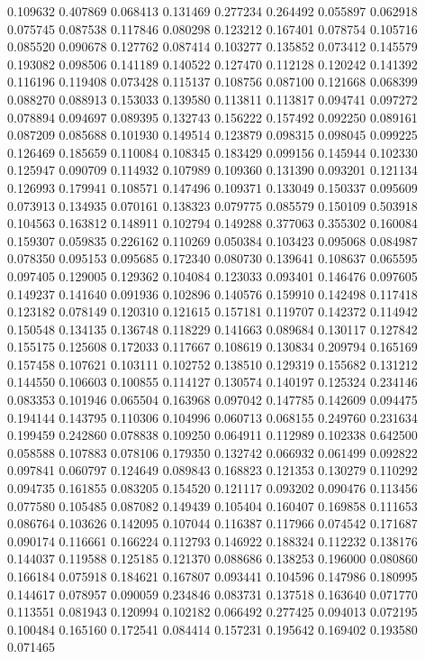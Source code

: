 0.109632
0.407869
0.068413
0.131469
0.277234
0.264492
0.055897
0.062918
0.075745
0.087538
0.117846
0.080298
0.123212
0.167401
0.078754
0.105716
0.085520
0.090678
0.127762
0.087414
0.103277
0.135852
0.073412
0.145579
0.193082
0.098506
0.141189
0.140522
0.127470
0.112128
0.120242
0.141392
0.116196
0.119408
0.073428
0.115137
0.108756
0.087100
0.121668
0.068399
0.088270
0.088913
0.153033
0.139580
0.113811
0.113817
0.094741
0.097272
0.078894
0.094697
0.089395
0.132743
0.156222
0.157492
0.092250
0.089161
0.087209
0.085688
0.101930
0.149514
0.123879
0.098315
0.098045
0.099225
0.126469
0.185659
0.110084
0.108345
0.183429
0.099156
0.145944
0.102330
0.125947
0.090709
0.114932
0.107989
0.109360
0.131390
0.093201
0.121134
0.126993
0.179941
0.108571
0.147496
0.109371
0.133049
0.150337
0.095609
0.073913
0.134935
0.070161
0.138323
0.079775
0.085579
0.150109
0.503918
0.104563
0.163812
0.148911
0.102794
0.149288
0.377063
0.355302
0.160084
0.159307
0.059835
0.226162
0.110269
0.050384
0.103423
0.095068
0.084987
0.078350
0.095153
0.095685
0.172340
0.080730
0.139641
0.108637
0.065595
0.097405
0.129005
0.129362
0.104084
0.123033
0.093401
0.146476
0.097605
0.149237
0.141640
0.091936
0.102896
0.140576
0.159910
0.142498
0.117418
0.123182
0.078149
0.120310
0.121615
0.157181
0.119707
0.142372
0.114942
0.150548
0.134135
0.136748
0.118229
0.141663
0.089684
0.130117
0.127842
0.155175
0.125608
0.172033
0.117667
0.108619
0.130834
0.209794
0.165169
0.157458
0.107621
0.103111
0.102752
0.138510
0.129319
0.155682
0.131212
0.144550
0.106603
0.100855
0.114127
0.130574
0.140197
0.125324
0.234146
0.083353
0.101946
0.065504
0.163968
0.097042
0.147785
0.142609
0.094475
0.194144
0.143795
0.110306
0.104996
0.060713
0.068155
0.249760
0.231634
0.199459
0.242860
0.078838
0.109250
0.064911
0.112989
0.102338
0.642500
0.058588
0.107883
0.078106
0.179350
0.132742
0.066932
0.061499
0.092822
0.097841
0.060797
0.124649
0.089843
0.168823
0.121353
0.130279
0.110292
0.094735
0.161855
0.083205
0.154520
0.121117
0.093202
0.090476
0.113456
0.077580
0.105485
0.087082
0.149439
0.105404
0.160407
0.169858
0.111653
0.086764
0.103626
0.142095
0.107044
0.116387
0.117966
0.074542
0.171687
0.090174
0.116661
0.166224
0.112793
0.146922
0.188324
0.112232
0.138176
0.144037
0.119588
0.125185
0.121370
0.088686
0.138253
0.196000
0.080860
0.166184
0.075918
0.184621
0.167807
0.093441
0.104596
0.147986
0.180995
0.144617
0.078957
0.090059
0.234846
0.083731
0.137518
0.163640
0.071770
0.113551
0.081943
0.120994
0.102182
0.066492
0.277425
0.094013
0.072195
0.100484
0.165160
0.172541
0.084414
0.157231
0.195642
0.169402
0.193580
0.071465
